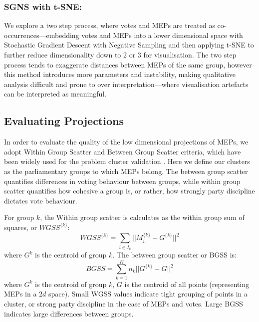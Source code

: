 \documentclass{llncs}
\newcommand{\clust}[2][k]{#2^{\{#1\}}}
\begin{document}
\subsubsection{SGNS with t-SNE:}
We explore a two step process, where votes and MEPs are treated as co-occurrences---embedding votes and MEPs into a lower dimensional space with Stochastic Gradient Descent with Negative Sampling\cite{levy2014neural} and then applying t-SNE to further reduce dimensionality down to 2 or 3 for visualisation.  The two step process tends to exaggerate distances between MEPs of the same group, however this method introduces more parameters and instability, making qualitative analysis difficult and prone to over interpretation---where visualisation artefacts can be interpreted as meaningful.

\subsection{Evaluating Projections}
In order to evaluate the quality of the low dimensional projections of MEPs, we adopt Within Group Scatter and Between Group Scatter criteria, which have been widely used for the problem cluster validation \cite{desgraupes2013clustering}. Here we define our clusters as the parliamentary groups to which MEPs belong. The between group scatter quantifies differences in voting behaviour between groups, while within group scatter quantifies how cohesive a group is, or rather, how strongly party discipline dictates vote behaviour\cite{Hix821}. 

For group $k$, the Within group scatter is calculates as the within group sum of squares, or $\clust{WGSS}$:
$$
\clust{WGSS} = \sum_{i\in I_{k}} ||\clust{M}_{i}-\clust{G}||^2
$$
where $G^k$ is the centroid of group $k$. The between group scatter or BGSS is:
$$
BGSS=\sum_{k=1}^K n_{k}||\clust{G}-G||^2
$$
where $G^k$ is the centroid of group $k$, $G$ is the centroid of all points (representing MEPs in a $2d$ space). Small WGSS values indicate tight grouping of points in a cluster, or strong party discipline in the case of MEPs and votes. Large BGSS indicates large differences between groups.


\end{document}
